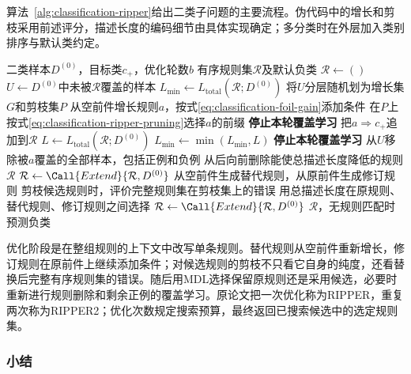 算法~\ref{alg:classification-ripper}给出二类子问题的主要流程。伪代码中的增长和剪枝采用前述评分，描述长度的编码细节由具体实现确定；多分类时在外层加入类别排序与默认类约定。

\begin{algorithm}[RIPPER的覆盖学习与规则优化]
  \label{alg:classification-ripper}
  \begin{algorithmic}[1]
    \Require 二类样本$D^{(0)}$，目标类$c_+$，优化轮数$b$
    \Ensure 有序规则集$\mathcal{R}$及默认负类
    \State $\mathcal{R}\gets()$
      \State $U\gets D^{(0)}$中未被$\mathcal{R}$覆盖的样本
      \State $L_{\min}\gets L_{\mathrm{total}}(\mathcal{R};D^{(0)})$
        \State 将$U$分层随机划为增长集$G$和剪枝集$P$
        \State 从空前件增长规则$a$，按式\eqref{eq:classification-foil-gain}添加条件
        \State 在$P$上按式\eqref{eq:classification-ripper-pruning}选择$a$的前缀
          \State \textbf{停止本轮覆盖学习}
        \EndIf
        \State 把$a\Longrightarrow c_+$追加到$\mathcal{R}$
        \State $L\gets L_{\mathrm{total}}(\mathcal{R};D^{(0)})$
        \State $L_{\min}\gets\min(L_{\min},L)$
          \State \textbf{停止本轮覆盖学习}
        \EndIf
        \State 从$U$移除被$a$覆盖的全部样本，包括正例和负例
      \EndWhile
      \State 从后向前删除能使总描述长度降低的规则
      \State \Return $\mathcal{R}$
    \EndFunction
    \State $\mathcal{R}\gets\Call{Extend}{\mathcal{R},D^{(0)}}$
        \State 从空前件生成替代规则，从原前件生成修订规则
        \State 剪枝候选规则时，评价完整规则集在剪枝集上的错误
        \State 用总描述长度在原规则、替代规则、修订规则之间选择
      \EndFor
      \State $\mathcal{R}\gets\Call{Extend}{\mathcal{R},D^{(0)}}$
    \EndFor
    \State \Return $\mathcal{R}$，无规则匹配时预测负类
  \end{algorithmic}
\end{algorithm}

优化阶段是在整组规则的上下文中改写单条规则。替代规则从空前件重新增长，修订规则在原前件上继续添加条件；对候选规则的剪枝不只看它自身的纯度，还看替换后完整有序规则集的错误。随后用MDL选择保留原规则还是采用候选，必要时重新进行规则删除和剩余正例的覆盖学习。原论文把一次优化称为RIPPER，重复两次称为RIPPER2；优化次数规定搜索预算，最终返回已搜索候选中的选定规则集。

\subsubsection{小结}
\label{sec:classification-ripper-summary}


